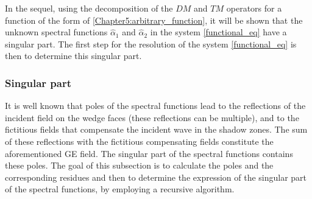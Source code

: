 In the sequel, using the decomposition of the $DM$ and $TM$ operators for a function of the form of \eqref{Chapter5:arbitrary_function}, it will be shown that the unknown spectral functions $\hat{\alpha}_1$ and $\hat{\alpha}_2$ in the system \eqref{functional_eq} have a singular part. The first step for the resolution of the system \eqref{functional_eq} is then to determine this singular part.

\subsubsection{Singular part}
\label{Chapter5:sing_part}

It is well known that poles of the spectral functions lead to the reflections of the incident field on the wedge faces (these reflections can be multiple), and to the fictitious fields that compensate the incident wave in the shadow zones. The sum of these reflections with the fictitious compensating fields constitute the aforementioned GE field. The singular part of the spectral functions contains these poles. The goal of this subsection is to calculate the poles and the corresponding residues and then to determine the expression of the singular part of the spectral functions, by employing a recursive algorithm. 


